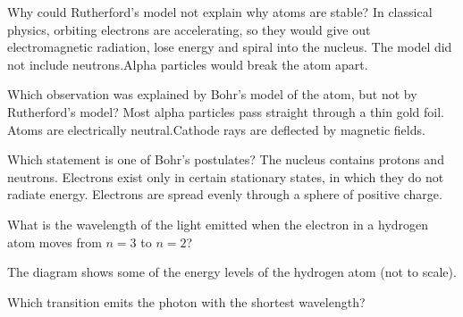 
\begin{quizq}{}
Why could Rutherford's model not explain why atoms are stable?
  {In classical physics, orbiting electrons are accelerating, so they would give out electromagnetic
   radiation, lose energy and spiral into the nucleus.}
  {The model did not include neutrons.}{Alpha particles would break the atom apart.}
\end{quizq}

\begin{quizq}{}
Which observation was explained by Bohr's model of the atom, but not by Rutherford's model?
  {Most alpha particles pass straight through a thin gold foil.}
  {Atoms are electrically neutral.}{Cathode rays are deflected by magnetic fields.}
\end{quizq}

\begin{quizq}{}
Which statement is one of Bohr's postulates?
  {The nucleus contains protons and neutrons.}
  {Electrons exist only in certain stationary states, in which they do not radiate energy.}
  {Electrons are spread evenly through a sphere of positive charge.}
\end{quizq}

\begin{quizq}{}
What is the wavelength of the light emitted when the electron in a hydrogen atom moves from $n = 3$ to
$n = 2$?
\end{quizq}

\begin{quizq}{}
The diagram shows some of the energy levels of the hydrogen atom (not to scale).
\begin{center}
\end{center}
Which transition emits the photon with the shortest wavelength?
\end{quizq}

